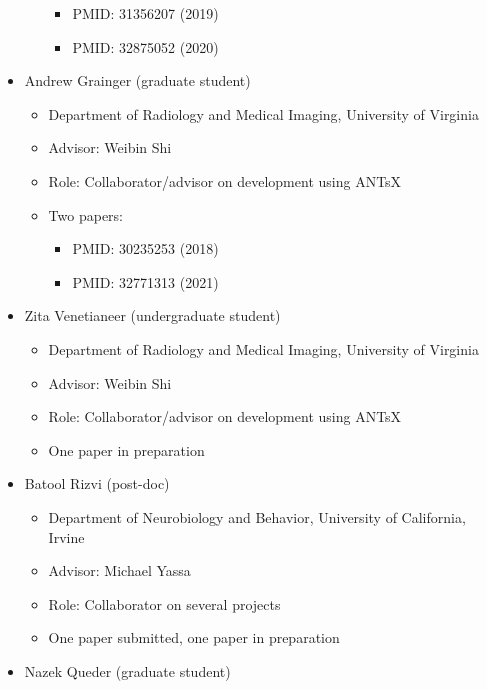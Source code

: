 \documentclass[
  11pt,
]{article}
\providecommand{\tightlist}{%
  \setlength{\itemsep}{0pt}\setlength{\parskip}{0pt}}
\begin{document}
\begin{itemize}
\begin{itemize}
    \begin{itemize}
    \tightlist
    \item
      PMID: 31356207 (2019)
    \item
      PMID: 32875052 (2020)
    \end{itemize}
  \end{itemize}
\item
  Andrew Grainger (graduate student)

  \begin{itemize}
  \tightlist
  \item
    Department of Radiology and Medical Imaging, University of Virginia
  \item
    Advisor: Weibin Shi
  \item
    Role: Collaborator/advisor on development using ANTsX
  \item
    Two papers:

    \begin{itemize}
    \tightlist
    \item
      PMID: 30235253 (2018)
    \item
      PMID: 32771313 (2021)
    \end{itemize}
  \end{itemize}
\item
  Zita Venetianeer (undergraduate student)

  \begin{itemize}
  \tightlist
  \item
    Department of Radiology and Medical Imaging, University of Virginia
  \item
    Advisor: Weibin Shi
  \item
    Role: Collaborator/advisor on development using ANTsX
  \item
    One paper in preparation
  \end{itemize}
\item
  Batool Rizvi (post-doc)

  \begin{itemize}
  \tightlist
  \item
    Department of Neurobiology and Behavior, University of California,
    Irvine
  \item
    Advisor: Michael Yassa
  \item
    Role: Collaborator on several projects
  \item
    One paper submitted, one paper in preparation
  \end{itemize}
\item
  Nazek Queder (graduate student)


\end{itemize}
\end{document}
